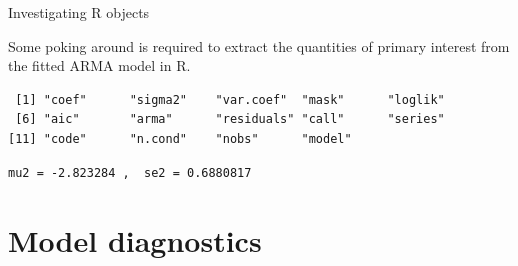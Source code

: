 \begin{frame}[fragile]{Investigating R objects}
 
Some poking around is required to extract the quantities of primary interest from the fitted ARMA model in R. 

\begin{knitrout}\small
{}\color{fgcolor}\begin{kframe}
\begin{alltt}
\end{alltt}
\begin{verbatim}
 [1] "coef"      "sigma2"    "var.coef"  "mask"      "loglik"   
 [6] "aic"       "arma"      "residuals" "call"      "series"   
[11] "code"      "n.cond"    "nobs"      "model"    
\end{verbatim}
\end{kframe}
\end{knitrout}

\begin{knitrout}\small
{}\color{fgcolor}\begin{kframe}
\begin{alltt}
 \hlkwb{<-} \hlopt{$}\hldef{coef[}\hldef{]}
 \hlkwb{<-} \hlopt{$}\hldef{var.coef[}\hldef{,}\hldef{])}
\hldef{(}  \hldef{)}
\end{alltt}
\begin{verbatim}
mu2 = -2.823284 ,  se2 = 0.6880817 
\end{verbatim}
\end{kframe}
\end{knitrout}

\end{frame}

\section{Model diagnostics}

